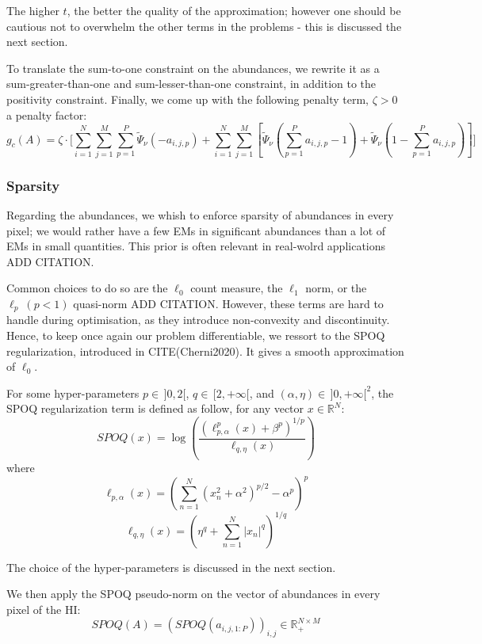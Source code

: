 \documentclass{article}
\begin{document}
The higher $t$, the better the quality of the approximation; however one should be cautious not to overwhelm the other terms in the problems - this is discussed the next section.

To translate the sum-to-one constraint on the abundances, we rewrite it as a sum-greater-than-one and sum-lesser-than-one constraint, in addition to the positivity constraint. Finally, we come up with the following penalty term, $\zeta > 0$ a penalty factor:
\begin{equation}\label{eq:g_c}
  g_c (A) = \zeta \cdot \Bigg[ \sum_{i = 1}^N \sum_{j = 1}^M \sum_{p=1}^P \tilde\Psi_\nu (-a_{i,j,p}) + \sum_{i = 1}^N \sum_{j = 1}^M \left[ \tilde\Psi_\nu(\sum_{p=1}^P a_{i,j,p} - 1) + \tilde\Psi_\nu(1 - \sum_{p=1}^Pa_{i,j,p}) \right] \Bigg]
\end{equation}

\subsubsection{Sparsity}

Regarding the abundances, we whish to enforce sparsity of abundances in every pixel; we would rather have a few EMs in significant abundances than a lot of EMs in small quantities. This prior is often relevant in real-wolrd applications ADD CITATION.

Common choices to do so are the $\ell_0$ count measure, the $\ell_1$ norm, or the $\ell_p \ (p<1)$ quasi-norm ADD CITATION. However, these terms are hard to handle during optimisation, as they introduce non-convexity and discontinuity. Hence, to keep once again our problem differentiable, we ressort to the SPOQ regularization, introduced in CITE(Cherni2020). It gives a smooth approximation of $\ell_0$.

For some hyper-parameters $p\in \, ]0, 2[$, $q\in \, [2, +\infty[$, and $(\alpha, \eta) \in \, ]0, +\infty [^2$, the SPOQ regularization term is defined as follow, for any vector $x \in \mathbb{R}^N$:
$$SPOQ(x) = \log \left( \frac{(\ell_{p,\alpha}^p (x) + \beta^p)^{1/p}}{\ell_{q,\eta} (x)} \right)$$
        where
        $$\ell_{p,\alpha} (x) = \left( \sum_{n=1}^N (x_n^2 + \alpha^2)^{p/2} - \alpha^p \right)^p$$
        $$\ell_{q,\eta} (x) = \left( \eta^q + \sum_{n=1}^N |x_n|^q \right)^{1/q}$$

The choice of the hyper-parameters is discussed in the next section.

We then apply the SPOQ pseudo-norm on the vector of abundances in every pixel of the HI:
$$SPOQ(A) = (SPOQ(a_{i,j,1:P}))_{i, j} \in \mathbb{R}_+^{N \times M}$$
\end{document}
